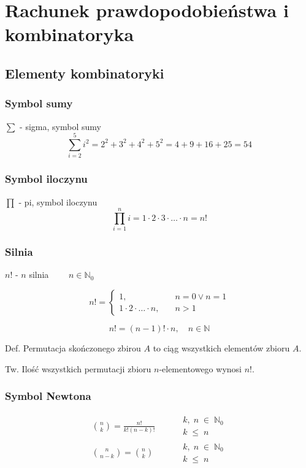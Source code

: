 \documentclass[../Matematyka.tex]{subfiles}
\begin{document}
\section{Rachunek prawdopodobieństwa i kombinatoryka}

\subsection{Elementy kombinatoryki}
    \subsubsection{Symbol sumy}
    \(\sum\) - sigma, symbol sumy
    \[\sum^{5}_{i=2} i^2 = 2^2 + 3^2 + 4^2 + 5^2 = 4 + 9 + 16 + 25 = 54\]

    \subsubsection{Symbol iloczynu}
    \(\prod\) - pi, symbol iloczynu
    \[\prod^{n}_{i=1} i = 1 \cdot 2 \cdot 3 \cdot \ldots \cdot n = n!\]

    \subsubsection{Silnia}
    \(n!\) - \(n\) silnia \(\qquad n \in \mathbb{N}_0\)

    \begin{displaymath}
        n! =
        \begin{cases}
            1, & \quad n = 0 \lor n = 1 \\
            1 \cdot 2 \cdot \ldots \cdot n, & \quad n > 1
        \end{cases}
    \end{displaymath}

    \[n! = (n - 1)! \cdot n, \quad n \in \mathbb{N}\]

    Def. Permutacja skończonego zbirou \(A\) to ciąg wszystkich elementów zbioru \(A\).\par
    Tw. Ilość wszystkich permutacji zbioru \(n\)-elementowego wynosi \(n!\).

    \subsubsection{Symbol Newtona}

    \begin{align*}
        \binom{n}{k} = 
        \frac{n!}{k!(n-k)!} \qquad&
        \substack{
            k,\;n\;\in\;\mathbb{N}_0 \\
            k\;\leq\;n
        }\\
        \binom{n}{n-k} = 
        \binom{n}{k} \qquad&
        \substack{
            k,\;n\;\in\;\mathbb{N}_0 \\
            k\;\leq\;n
        }
    \end{align*}
\end{document}
